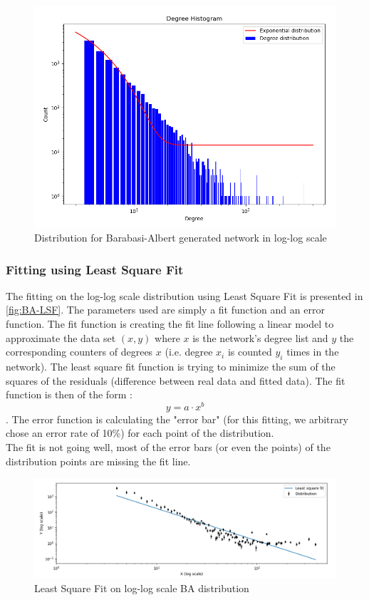 \documentclass{article}
\begin{document}
\begin{figure}[h]
  \centering
  \includegraphics[scale=0.55]{fig/BA-distribution-log.png}
  \caption{Distribution for Barabasi-Albert generated network in log-log scale}
  \label{fig:BA-distribution-log}
\end{figure}

\subsubsection*{Fitting using Least Square Fit} 

The fitting on the log-log scale distribution using Least Square Fit is presented in \autoref{fig:BA-LSF}. The parameters used are simply a fit function and an error function. The fit function is creating the fit line following a linear model to approximate the data set $(x,y)$ where $x$ is the network's degree list and $y$ the corresponding counters of degrees $x$ (i.e. degree $x_{i}$ is counted $y_{i}$ times in the network). The least square fit function is trying to minimize the sum of the squares of the residuals (difference between real data and fitted data). The fit function is then of the form : $$ y = a \cdot x^{b} $$. The error function is calculating the "error bar" (for this fitting, we arbitrary chose an error rate of 10\%) for each point of the distribution.  \\

The fit is not going well, most of the error bars (or even the points) of the distribution points are missing the fit line. 


\begin{figure}[h]
  \centering
  \includegraphics[scale=0.5]{fig/BA-LSF.png}
  \caption{Least Square Fit on log-log scale BA distribution}
  \label{fig:BA-LSF}
\end{figure} 
\end{document}
